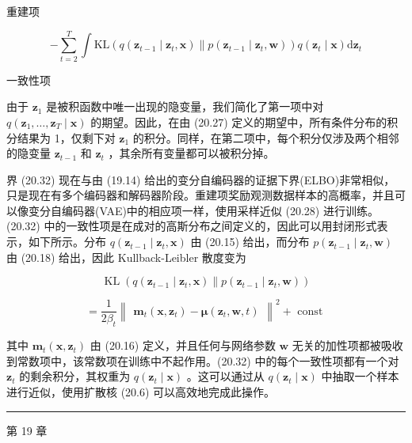 \documentclass[10pt]{article}
\newcommand{\HRule}{\begin{center}\rule{0.9\linewidth}{0.2mm}\end{center}}
\begin{document}
重建项

\[
- \mathop{\sum }\limits_{{t = 2}}^{T}\int \mathrm{{KL}}\left( {q\left( {{\mathbf{z}}_{t - 1} \mid  {\mathbf{z}}_{t},\mathbf{x}}\right) \parallel p\left( {{\mathbf{z}}_{t - 1} \mid  {\mathbf{z}}_{t},\mathbf{w}}\right) }\right) q\left( {{\mathbf{z}}_{t} \mid  \mathbf{x}}\right) \mathrm{d}{\mathbf{z}}_{t} \tag{20.32}
\]

一致性项

由于 \({\mathbf{z}}_{1}\) 是被积函数中唯一出现的隐变量，我们简化了第一项中对 \(q\left( {{\mathbf{z}}_{1},\ldots ,{\mathbf{z}}_{T} \mid  \mathbf{x}}\right)\) 的期望。因此，在由 (20.27) 定义的期望中，所有条件分布的积分结果为 1，仅剩下对 \({\mathbf{z}}_{1}\) 的积分。同样，在第二项中，每个积分仅涉及两个相邻的隐变量 \({\mathbf{z}}_{t - 1}\) 和 \({\mathbf{z}}_{t}\) ，其余所有变量都可以被积分掉。

界 (20.32) 现在与由 (19.14) 给出的变分自编码器的证据下界(ELBO)非常相似，只是现在有多个编码器和解码器阶段。重建项奖励观测数据样本的高概率，并且可以像变分自编码器(VAE)中的相应项一样，使用采样近似 (20.28) 进行训练。(20.32) 中的一致性项是在成对的高斯分布之间定义的，因此可以用封闭形式表示，如下所示。分布 \(q\left( {{\mathbf{z}}_{t - 1} \mid  {\mathbf{z}}_{t},\mathbf{x}}\right)\) 由 (20.15) 给出，而分布 \(p\left( {{\mathbf{z}}_{t - 1} \mid  {\mathbf{z}}_{t},\mathbf{w}}\right)\) 由 (20.18) 给出，因此 Kullback-Leibler 散度变为

\[
\operatorname{KL}\left( {q\left( {{\mathbf{z}}_{t - 1} \mid  {\mathbf{z}}_{t},\mathbf{x}}\right) \parallel p\left( {{\mathbf{z}}_{t - 1} \mid  {\mathbf{z}}_{t},\mathbf{w}}\right) }\right)
\]

\[
= \frac{1}{2{\beta }_{t}}{\begin{Vmatrix}{\mathbf{m}}_{t}\left( \mathbf{x},{\mathbf{z}}_{t}\right)  - \mathbf{\mu }\left( {\mathbf{z}}_{t},\mathbf{w},t\right) \end{Vmatrix}}^{2} + \text{ const } \tag{20.33}
\]

其中 \({\mathbf{m}}_{t}\left( {\mathbf{x},{\mathbf{z}}_{t}}\right)\) 由 (20.16) 定义，并且任何与网络参数 \(\mathbf{w}\) 无关的加性项都被吸收到常数项中，该常数项在训练中不起作用。(20.32) 中的每个一致性项都有一个对 \({\mathbf{z}}_{t}\) 的剩余积分，其权重为 \(q\left( {{\mathbf{z}}_{t} \mid  \mathbf{x}}\right)\) 。这可以通过从 \(q\left( {{\mathbf{z}}_{t} \mid  \mathbf{x}}\right)\) 中抽取一个样本进行近似，使用扩散核 (20.6) 可以高效地完成此操作。

\HRule

第 19 章
\end{document}
